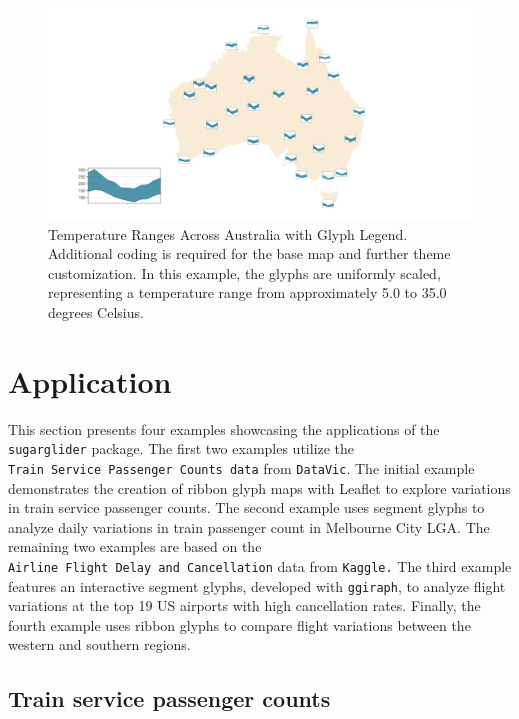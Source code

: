 \begin{figure}

{\centering \includegraphics[width=1\linewidth]{figures/legend_glyph} 

}

\caption{Temperature Ranges Across Australia with Glyph Legend. Additional coding is required for the base map and further theme customization. In this example, the glyphs are uniformly scaled, representing a temperature range from approximately 5.0 to 35.0 degrees Celsius.}\label{fig:unnamed-chunk-15}
\end{figure}

\hypertarget{application}{%
\section{Application}\label{application}}

This section presents four examples showcasing the applications of the \texttt{sugarglider} package. The first two examples utilize the \texttt{Train\ Service\ Passenger\ Counts\ data} from \texttt{DataVic}. The initial example demonstrates the creation of ribbon glyph maps with Leaflet to explore variations in train service passenger counts. The second example uses segment glyphs to analyze daily variations in train passenger count in Melbourne City LGA.
The remaining two examples are based on the \texttt{Airline\ Flight\ Delay\ and\ Cancellation} data from \texttt{Kaggle.} The third example features an interactive segment glyphs, developed with \texttt{ggiraph}, to analyze flight variations at the top 19 US airports with high cancellation rates. Finally, the fourth example uses ribbon glyphs to compare flight variations between the western and southern regions.

\hypertarget{train-service-passenger-counts}{%
\subsection{Train service passenger counts}\label{train-service-passenger-counts}}

